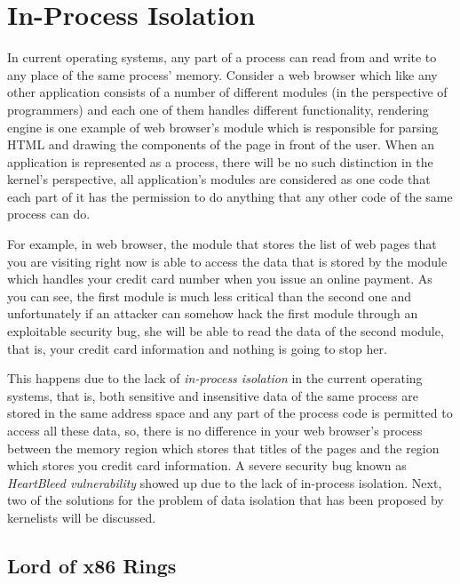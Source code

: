 \section{In-Process Isolation}\label{in-process-isolation}

In current operating systems, any part of a process can read from and
write to any place of the same process' memory. Consider a web browser
which like any other application consists of a number of different
modules (in the perspective of programmers) and each one of them handles
different functionality, rendering engine is one example of web
browser's module which is responsible for parsing HTML and drawing the
components of the page in front of the user. When an application is
represented as a process, there will be no such distinction in the
kernel's perspective, all application's modules are considered as one
code that each part of it has the permission to do anything that any
other code of the same process can do.

For example, in web browser, the module that stores the list of web
pages that you are visiting right now is able to access the data that is
stored by the module which handles your credit card number when you
issue an online payment. As you can see, the first module is much less
critical than the second one and unfortunately if an attacker can
somehow hack the first module through an exploitable security bug, she
will be able to read the data of the second module, that is, your credit
card information and nothing is going to stop her.

This happens due to the lack of \emph{in-process isolation} in the
current operating systems, that is, both sensitive and insensitive data
of the same process are stored in the same address space and any part of
the process code is permitted to access all these data, so, there is no
difference in your web browser's process between the memory region which
stores that titles of the pages and the region which stores you credit
card information. A severe security bug known as \emph{HeartBleed
vulnerability} showed up due to the lack of in-process isolation. Next,
two of the solutions for the problem of data isolation that has been
proposed by kernelists will be discussed.

\subsection{Lord of x86 Rings}\label{lord-of-x86-rings}

